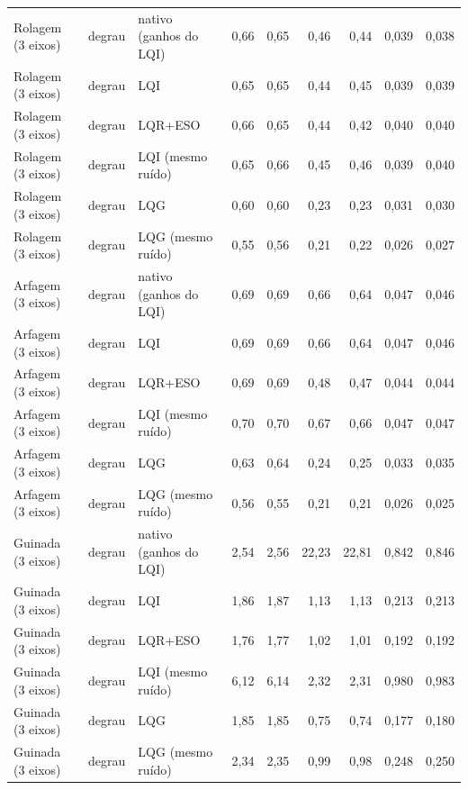 \begin{longtable}{lllrrrrrr}
Rolagem (3 eixos) & degrau & nativo (ganhos do LQI) & 0,66 & 0,65 & 0,46 & 0,44 & 0,039 & 0,038 \\
Rolagem (3 eixos) & degrau & LQI & 0,65 & 0,65 & 0,44 & 0,45 & 0,039 & 0,039 \\
Rolagem (3 eixos) & degrau & LQR+ESO & 0,66 & 0,65 & 0,44 & 0,42 & 0,040 & 0,040 \\
Rolagem (3 eixos) & degrau & LQI (mesmo ruído) & 0,65 & 0,66 & 0,45 & 0,46 & 0,039 & 0,040 \\
Rolagem (3 eixos) & degrau & LQG & 0,60 & 0,60 & 0,23 & 0,23 & 0,031 & 0,030 \\
Rolagem (3 eixos) & degrau & LQG (mesmo ruído) & 0,55 & 0,56 & 0,21 & 0,22 & 0,026 & 0,027 \\
Arfagem (3 eixos) & degrau & nativo (ganhos do LQI) & 0,69 & 0,69 & 0,66 & 0,64 & 0,047 & 0,046 \\
Arfagem (3 eixos) & degrau & LQI & 0,69 & 0,69 & 0,66 & 0,64 & 0,047 & 0,046 \\
Arfagem (3 eixos) & degrau & LQR+ESO & 0,69 & 0,69 & 0,48 & 0,47 & 0,044 & 0,044 \\
Arfagem (3 eixos) & degrau & LQI (mesmo ruído) & 0,70 & 0,70 & 0,67 & 0,66 & 0,047 & 0,047 \\
Arfagem (3 eixos) & degrau & LQG & 0,63 & 0,64 & 0,24 & 0,25 & 0,033 & 0,035 \\
Arfagem (3 eixos) & degrau & LQG (mesmo ruído) & 0,56 & 0,55 & 0,21 & 0,21 & 0,026 & 0,025 \\
Guinada (3 eixos) & degrau & nativo (ganhos do LQI) & 2,54 & 2,56 & 22,23 & 22,81 & 0,842 & 0,846 \\
Guinada (3 eixos) & degrau & LQI & 1,86 & 1,87 & 1,13 & 1,13 & 0,213 & 0,213 \\
Guinada (3 eixos) & degrau & LQR+ESO & 1,76 & 1,77 & 1,02 & 1,01 & 0,192 & 0,192 \\
Guinada (3 eixos) & degrau & LQI (mesmo ruído) & 6,12 & 6,14 & 2,32 & 2,31 & 0,980 & 0,983 \\
Guinada (3 eixos) & degrau & LQG & 1,85 & 1,85 & 0,75 & 0,74 & 0,177 & 0,180 \\
Guinada (3 eixos) & degrau & LQG (mesmo ruído) & 2,34 & 2,35 & 0,99 & 0,98 & 0,248 & 0,250 \\
\end{longtable}

